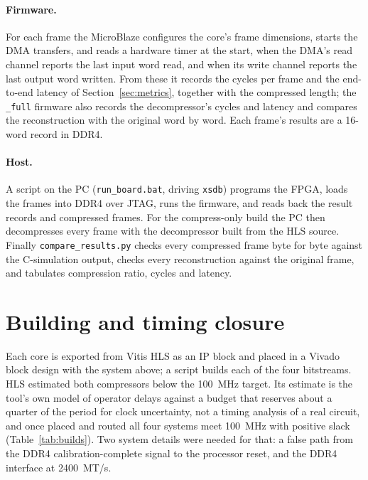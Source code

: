 \paragraph{Firmware.} For each frame the MicroBlaze configures the core's frame
dimensions, starts the DMA transfers, and reads a hardware timer at the start,
when the DMA's read channel reports the last input word read, and when its
write channel reports the last output word written. From these it
records the cycles per frame and the end-to-end latency of
Section~\ref{sec:metrics}, together with the compressed length; the
\texttt{\_full} firmware also records the decompressor's cycles and latency and
compares the reconstruction with the original word by word. Each frame's
results are a 16-word record in DDR4.

\paragraph{Host.} A script on the PC (\texttt{run\_board.bat}, driving
\texttt{xsdb}) programs the FPGA, loads the frames into DDR4 over JTAG, runs the
firmware, and reads back the result records and compressed frames. For the
compress-only build the PC then decompresses every frame with the decompressor
built from the HLS source. Finally \texttt{compare\_results.py} checks every
compressed frame byte for byte against the C-simulation output, checks every
reconstruction against the original frame, and tabulates compression ratio,
cycles and latency.

\section{Building and timing closure}
\label{sec:timing}

Each core is exported from Vitis HLS as an IP block and placed in a Vivado block
design with the system above; a script builds each of the four bitstreams. HLS
estimated both compressors below the \SI{100}{\mega\hertz} target. Its estimate
is the tool's own model of operator delays against a budget that reserves
about a quarter of the period for clock uncertainty, not a timing analysis of a
real circuit, and once placed and routed all four systems meet
\SI{100}{\mega\hertz} with positive slack (Table~\ref{tab:builds}). Two system
details were needed for that: a false path from the DDR4 calibration-complete
signal to the processor reset, and the DDR4 interface at \SI{2400}{MT/s}.

